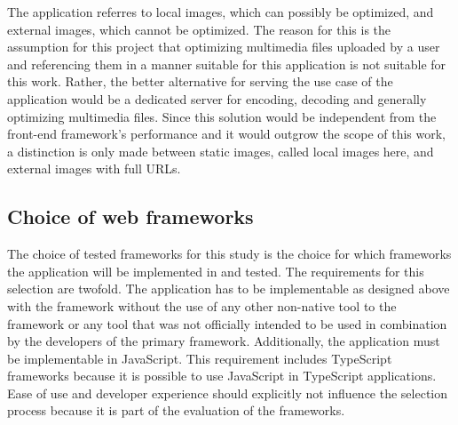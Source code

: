 \documentclass[a4paper, 12pt]{article}
\begin{document}
The application referres to local images, which can possibly be optimized, and external images, which cannot be optimized.
The reason for this is the assumption for this project that optimizing multimedia files uploaded by a user and referencing them in a manner suitable for this application is not suitable for this work.
Rather, the better alternative for serving the use case of the application would be a dedicated server for encoding, decoding and generally optimizing multimedia files.
Since this solution would be independent from the front-end framework's performance and it would outgrow the scope of this work, a distinction is only made between static images, called local images here, and external images with full URLs.

\subsection{Choice of web frameworks}

The choice of tested frameworks for this study is the choice for which frameworks the application will be implemented in and tested.
The requirements for this selection are twofold.
The application has to be implementable as designed above with the framework without the use of any other non-native tool to the framework or any tool that was not officially intended to be used in combination by the developers of the primary framework.
Additionally, the application must be implementable in JavaScript.
This requirement includes TypeScript frameworks because it is possible to use JavaScript in TypeScript applications. %
Ease of use and developer experience should explicitly not influence the selection process because it is part of the evaluation of the frameworks.
\end{document}

